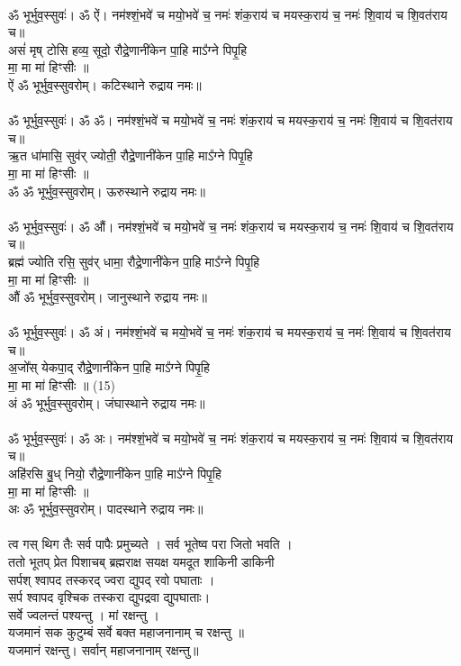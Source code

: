 \\
{\small ॐ भूर्भुव॒स्सुवः॑। ॐ ऐं। नम॑श्शं॒भवे॑ च मयो॒भवे॑ च॒ नमः॑ शंक॒राय॑ च मयस्क॒राय॑ च॒ नमः॑ शि॒वाय॑ च शि॒वत॑राय च॥}\\
असं॑ मृष् टोसि हव्य॒ सूदो॒ रौद्रे॒णानी॑केन पा॒हि माऽ᳚ग्ने पिपृ॒हि\\
मा॒ मा मा॑ हिꣳसीः ॥\\
{\small ऐं ॐ भूर्भुव॒स्सुवरोम्। कटिस्थाने रुद्राय नमः॥}\\
\\
{\small ॐ भूर्भुव॒स्सुवः॑। ॐ ॐ। नम॑श्शं॒भवे॑ च मयो॒भवे॑ च॒ नमः॑ शंक॒राय॑ च मयस्क॒राय॑ च॒ नमः॑ शि॒वाय॑ च शि॒वत॑राय च॥}\\
ऋ॒त धा॑मासि॒ सुव॑र् ज्योती॒ रौद्रे॒णानी॑केन पा॒हि माऽ᳚ग्ने पिपृ॒हि\\
मा॒ मा मा॑ हिꣳसीः ॥\\
{\small ॐ ॐ भूर्भुव॒स्सुवरोम्। ऊरुस्थाने रुद्राय नमः॥}\\
\\
{\small ॐ भूर्भुव॒स्सुवः॑। ॐ औं। नम॑श्शं॒भवे॑ च मयो॒भवे॑ च॒ नमः॑ शंक॒राय॑ च मयस्क॒राय॑ च॒ नमः॑ शि॒वाय॑ च शि॒वत॑राय च॥}\\
ब्रह्म॑ ज्योति रसि॒ सुव॑र् धामा॒ रौद्रे॒णानी॑केन पा॒हि माऽ᳚ग्ने पिपृ॒हि\\
मा॒ मा मा॑ हिꣳसीः ॥\\
{\small औं ॐ भूर्भुव॒स्सुवरोम्। जानुस्थाने रुद्राय नमः॥}\\
\\
{\small ॐ भूर्भुव॒स्सुवः॑। ॐ अं। नम॑श्शं॒भवे॑ च मयो॒भवे॑ च॒ नमः॑ शंक॒राय॑ च मयस्क॒राय॑ च॒ नमः॑ शि॒वाय॑ च शि॒वत॑राय च॥}\\
अ॒जो᳚स् येकपा॒द् रौद्रे॒णानी॑केन पा॒हि माऽ᳚ग्ने पिपृ॒हि\\
मा॒ मा मा॑ हिꣳसीः ॥ (15)\\
{\small अं ॐ भूर्भुव॒स्सुवरोम्। जंघास्थाने रुद्राय नमः॥}\\
\\
{\small ॐ भूर्भुव॒स्सुवः॑। ॐ अः। नम॑श्शं॒भवे॑ च मयो॒भवे॑ च॒ नमः॑ शंक॒राय॑ च मयस्क॒राय॑ च॒ नमः॑ शि॒वाय॑ च शि॒वत॑राय च॥}\\
अहि॑रसि बु॒ध् नियो॒ रौद्रे॒णानी॑केन पा॒हि माऽ᳚ग्ने पिपृ॒हि\\
मा॒ मा मा॑ हिꣳसीः ॥\\
{\small अः ॐ भूर्भुव॒स्सुवरोम्। पादस्थाने रुद्राय नमः॥}\\
\\
त्व गस् थिग तैः सर्व पापैः प्रमुच्यते । सर्व भूतेष्व परा जितो भवति ।\\
ततो भूतप् प्रेत पिशाचब् ब्रह्मराक्ष सयक्ष यमदूत शाकिनी डाकिनी \\
सर्पश् श्वापद तस्करद् ज्वरा द्युपद् रवो पघाताः । \\
{\small सर्प श्वापद वृश्चिक तस्करा द्युपद्रवा द्युपघाताः।}\\
सर्वे ज्वलन्तं पश्यन्तु । मां रक्षन्तु ।\\
यजमानं सक कुटुम्बं सर्वे बक्त महाजनानाम्  च  रक्षन्तु ॥\\
{\small यजमानं रक्षन्तु। सर्वान् महाजनानाम् रक्षन्तु॥}\\
